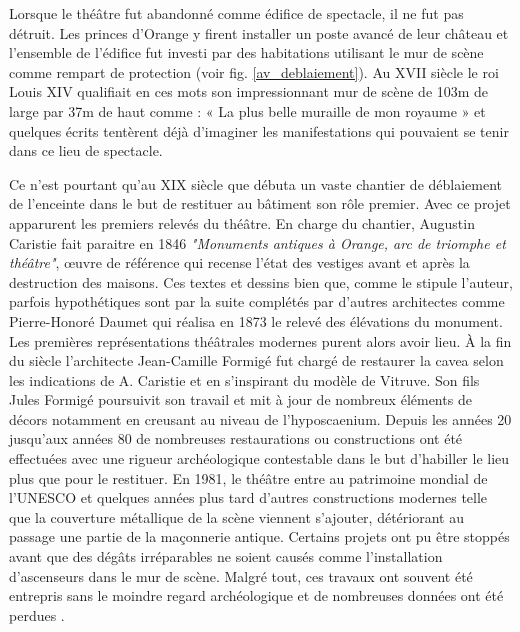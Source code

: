 			 Lorsque le théâtre fut abandonné comme édifice de spectacle, il ne fut pas détruit. Les princes d'Orange y firent installer un poste avancé de leur château et l’ensemble de l’édifice fut investi par des habitations utilisant le mur de scène comme rempart de protection (voir fig. \ref{av_deblaiement}). Au XVII siècle le roi Louis XIV qualifiait en ces mots son impressionnant mur de scène de 103m de large par 37m de haut comme : « La plus belle muraille de mon royaume » \cite[webpage]{siteTheatre} et quelques écrits tentèrent déjà d'imaginer les manifestations qui pouvaient se tenir dans ce lieu de spectacle. 
			 
			 Ce n'est pourtant qu'au XIX siècle que débuta un vaste chantier de déblaiement de l'enceinte dans le but de restituer au bâtiment son rôle premier. Avec ce projet apparurent les premiers relevés du théâtre. En charge du chantier, Augustin Caristie fait paraitre en 1846 \textit{"Monuments antiques à Orange, arc de triomphe et théâtre"}, \oe{}uvre de référence qui recense l'état des vestiges avant et après la destruction des maisons. Ces textes et dessins bien que, comme le stipule l'auteur, parfois hypothétiques sont par la suite complétés par d'autres architectes comme Pierre-Honoré Daumet qui réalisa en 1873 le relevé des élévations du monument. Les premières représentations théâtrales modernes purent alors avoir lieu. À la fin du siècle l'architecte Jean-Camille Formigé fut chargé de restaurer la \gls{cavea} selon les indications de A. Caristie et en s'inspirant du modèle de Vitruve. Son fils Jules Formigé poursuivit son travail et mit à jour de nombreux éléments de décors notamment en creusant au niveau de l'\gls{hyposcaenium}. Depuis les années 20 jusqu'aux années 80 de nombreuses restaurations ou constructions ont été effectuées avec une rigueur archéologique contestable dans le but d'habiller le lieu plus que pour le restituer. En 1981, le théâtre entre au patrimoine mondial de l'UNESCO et quelques années plus tard d'autres constructions modernes telle que la couverture métallique de la scène viennent s'ajouter, détériorant au passage une partie de la maçonnerie antique. Certains projets ont pu être stoppés avant que des dégâts irréparables ne soient causés comme l'installation d'ascenseurs dans le mur de scène. Malgré tout, ces travaux ont souvent été entrepris sans le moindre regard archéologique et de nombreuses données ont été perdues \cite[p 231- 236]{carteArcheo}.

